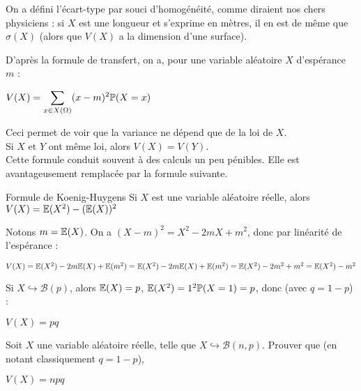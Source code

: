 \documentclass[12pt,a4paper]{report}
\begin{document}
\begin{remarque}{}
On a défini l'écart-type par souci d'homogénéité, comme diraient nos chers physiciens : si $X$ est une longueur et s'exprime en mètres, il en est de même que $\sigma(X)$ (alors que $V(X)$ a la dimension d'une surface).
\end{remarque}

\begin{remarque}{}
D'après la formule de transfert, on a, pour une variable aléatoire $X$ d'espérance $m$ : 
\begin{center}
$V(X) = \displaystyle \sum_{x \in X(\Omega)} (x-m)^2 \mathbb{P}(X=x)$
\end{center}
Ceci permet de voir que la variance ne dépend que de la loi de $X$. \\

Si $X$ et $Y$ ont même loi, alors $V(X) = V(Y)$. \\

Cette formule conduit souvent à des calculs un peu pénibles. Elle est avantageusement remplacée par la formule suivante.
\end{remarque}

\begin{proposition}{Formule de Koenig-Huygens}{}
Si $X$ est une variable aléatoire réelle, alors \\
$V(X) = \mathbb{E}(X^2)-(\mathbb{E}(X))^2$
\end{proposition}

\begin{demo}{}
Notons $m = \mathbb{E}(X)$. On a $(X-m)^2 = X^2-2mX+m^2$, donc par linéarité de l'espérance : 
\begin{center}
$V(X) = \mathbb{E}(X^2) - 2m\mathbb{E}(X) + \mathbb{E}(m^2) = \mathbb{E}(X^2) - 2m \mathbb{E}(X) + \mathbb{E}(m^2) = \mathbb{E}(X^2) - 2m^2 + m^2 = \mathbb{E}(X^2) - m^2$
\end{center}
\end{demo}

\begin{exemple}{} 
Si $X \hookrightarrow \mathcal{B}(p)$, alors $\mathbb{E}(X) = p$, $\mathbb{E}(X^2) = 1^2 \mathbb{P}(X=1) = p$, donc (avec $q = 1-p$) :
\begin{center}
$V(X) = pq$
\end{center}
\end{exemple}

\begin{exemple}[Exercice 15]{}
Soit $X$ une variable aléatoire réelle, telle que $X \hookrightarrow \mathcal{B}(n,p)$. Prouver que (en notant classiquement $q = 1-p$),
\begin{center}
$V(X) = npq$
\end{center}
\end{exemple}
\end{document}
